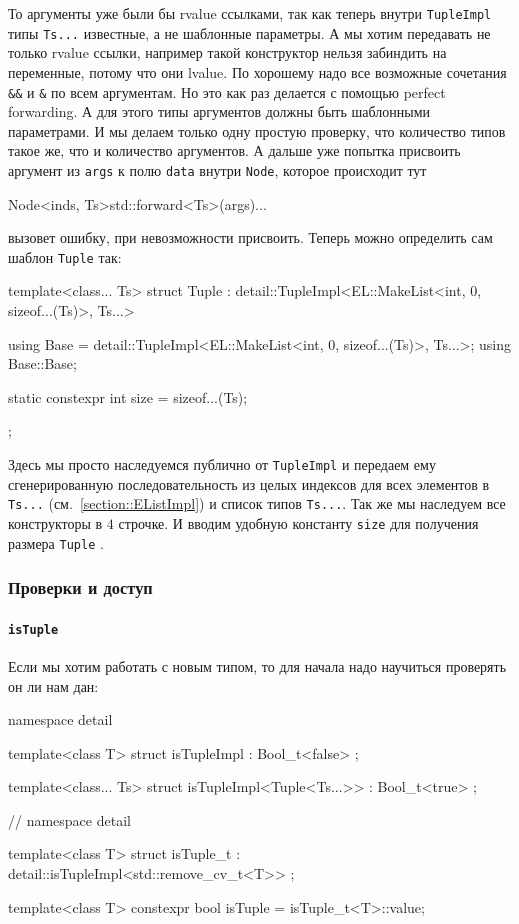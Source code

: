 То аргументы уже были бы rvalue ссылками, так как теперь внутри \verb"TupleImpl" типы \verb"Ts..." известные, а не шаблонные параметры.
А мы хотим передавать не только rvalue ссылки, например такой конструктор нельзя забиндить на переменные, потому что они lvalue.
По хорошему надо все возможные сочетания \verb"&&" и \verb"&" по всем аргументам.
Но это как раз делается с помощью perfect forwarding.
А для этого типы аргументов должны быть шаблонными параметрами.
И мы делаем только одну простую проверку, что количество типов такое же, что и количество аргументов.
А дальше уже попытка присвоить аргумент из \verb"args" к полю \verb"data" внутри \verb"Node", которое происходит тут
\begin{cppcode}[\nonumbers]
Node<inds, Ts>{std::forward<Ts>(args)}...
\end{cppcode}
вызовет ошибку, при невозможности присвоить.
Теперь можно определить сам шаблон \verb"Tuple" так:
\begin{cppcode}
template<class... Ts>
struct Tuple : detail::TupleImpl<EL::MakeList<int, 0, sizeof...(Ts)>, Ts...> {
  using Base = detail::TupleImpl<EL::MakeList<int, 0, sizeof...(Ts)>, Ts...>;
  using Base::Base;
  
  static constexpr int size = sizeof...(Ts);
};
\end{cppcode}
Здесь мы просто наследуемся публично от \verb"TupleImpl" и передаем ему сгенерированную последовательность из целых индексов для всех элементов в \verb"Ts..." (см.~\ref{section::EListImpl}) и список типов \verb"Ts...".
Так же мы наследуем все конструкторы в $4$ строчке.
И вводим удобную константу \verb"size" для получения размера \verb"Tuple" .

\subsubsection{Проверки и доступ}

\paragraph{\texttt{isTuple}}

Если мы хотим работать с новым типом, то для начала надо научиться проверять он ли нам дан:
\begin{cppcode}
namespace detail {
template<class T>
struct isTupleImpl : Bool_t<false> {};

template<class... Ts>
struct isTupleImpl<Tuple<Ts...>> : Bool_t<true> {};
} // namespace detail

template<class T>
struct isTuple_t : detail::isTupleImpl<std::remove_cv_t<T>> {};

template<class T>
constexpr bool isTuple = isTuple_t<T>::value;
\end{cppcode}

